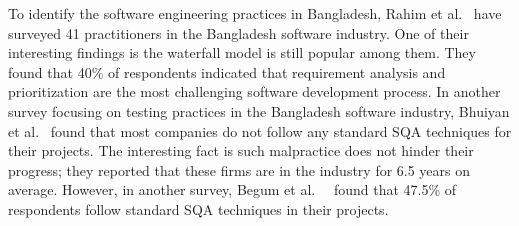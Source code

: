 To identify the software engineering practices in Bangladesh, Rahim et al.~\citep{Rahim2017} have surveyed 41 practitioners in the Bangladesh software industry. One of their interesting findings is the waterfall model is still popular among them. They found that 40\% of respondents indicated that requirement analysis and prioritization are the most challenging software development process. In another survey focusing on testing practices in the Bangladesh software industry, Bhuiyan et al.~\citep{M2018} found that most companies do not follow any standard SQA techniques for their projects. The interesting fact is such malpractice does not hinder their progress; they reported that these firms are in the industry for 6.5 years on average. However, in another survey, Begum et al.~\citep{Begum2009}  found that 47.5\% of respondents follow standard SQA techniques in their projects.